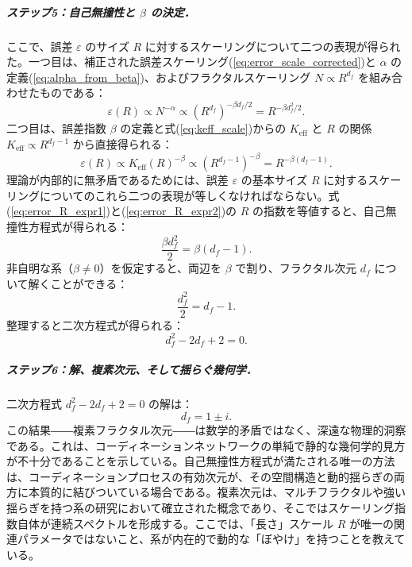 \documentclass[11pt,a4paper]{article}
\newcommand{\Ke}{K_{\mathrm{eff}}}
\theoremstyle{remark}
\begin{document}
	\subparagraph*{ステップ5：自己無撞性と \(\beta\) の決定．}
	ここで、誤差 \(\varepsilon\) のサイズ \(R\) に対するスケーリングについて二つの表現が得られた。一つ目は、補正された誤差スケーリング(\ref{eq:error_scale_corrected})と \(\alpha\) の定義(\ref{eq:alpha_from_beta})、およびフラクタルスケーリング \(N \propto R^{d_f}\) を組み合わせたものである：
	\begin{equation}
		\varepsilon(R) \propto N^{-\alpha} \propto (R^{d_f})^{-\beta d_f/2} = R^{-\beta d_f^2 / 2}.
		\label{eq:error_R_expr1}
	\end{equation}
	二つ目は、誤差指数 \(\beta\) の定義と式(\ref{eq:keff_scale})からの \(\Ke\) と \(R\) の関係 \(\Ke \propto R^{d_f-1}\) から直接得られる：
	\begin{equation}
		\varepsilon(R) \propto \Ke(R)^{-\beta} \propto (R^{d_f-1})^{-\beta} = R^{-\beta(d_f-1)}.
		\label{eq:error_R_expr2}
	\end{equation}
	理論が内部的に無矛盾であるためには、誤差 \(\varepsilon\) の基本サイズ \(R\) に対するスケーリングについてのこれら二つの表現が等しくなければならない。式(\ref{eq:error_R_expr1})と(\ref{eq:error_R_expr2})の \(R\) の指数を等値すると、自己無撞性方程式が得られる：
	\begin{equation}
		\frac{\beta d_f^2}{2} = \beta (d_f - 1).
		\label{eq:consistency}
	\end{equation}
	非自明な系（\(\beta \neq 0\)）を仮定すると、両辺を \(\beta\) で割り、フラクタル次元 \(d_f\) について解くことができる：
	\begin{equation}
		\frac{d_f^2}{2} = d_f - 1.
	\end{equation}
	整理すると二次方程式が得られる：
	\begin{equation}
		d_f^2 - 2d_f + 2 = 0.
		\label{eq:quadratic}
	\end{equation}
	
	\subparagraph*{ステップ6：解、複素次元、そして揺らぐ幾何学．}
	二次方程式 \(d_f^2 - 2d_f + 2 = 0\) の解は：
	\begin{equation}
		d_f = 1 \pm i.
		\label{eq:df_solution}
	\end{equation}
	この結果――複素フラクタル次元――は数学的矛盾ではなく、深遠な物理的洞察である。これは、コーディネーションネットワークの単純で静的な幾何学的見方が不十分であることを示している。自己無撞性方程式が満たされる唯一の方法は、コーディネーションプロセスの有効次元が、その空間構造と動的揺らぎの両方に本質的に結びついている場合である。複素次元は、マルチフラクタルや強い揺らぎを持つ系の研究において確立された概念であり、そこではスケーリング指数自体が連続スペクトルを形成する。ここでは、「長さ」スケール \(R\) が唯一の関連パラメータではないこと、系が内在的で動的な「ぼやけ」を持つことを教えている。
	
\end{document}
